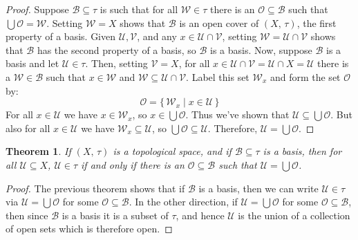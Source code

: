 \documentclass{article}
\theoremstyle{plain}
\newtheorem{theorem}{Theorem}[section]
\theoremstyle{normal}
\begin{document}
        \begin{proof}
            Suppose $\mathcal{B}\subseteq\tau$ is such that for all
            $\mathcal{W}\in\tau$ there is an $\mathcal{O}\subseteq\mathcal{B}$
            such that $\bigcup\mathcal{O}=\mathcal{W}$. Setting
            $\mathcal{W}=X$ shows that $\mathcal{B}$ is an open cover of
            $(X,\,\tau)$, the first property of a basis. Given
            $\mathcal{U},\mathcal{V}$, and any $x\in\mathcal{U}\cap\mathcal{V}$,
            setting $\mathcal{W}=\mathcal{U}\cap\mathcal{V}$ shows that
            $\mathcal{B}$ has the second property of a basis, so
            $\mathcal{B}$ is a basis. Now, suppose $\mathcal{B}$ is a
            basis and let $\mathcal{U}\in\tau$. Then, setting
            $\mathcal{V}=X$, for all
            $x\in\mathcal{U}\cap\mathcal{V}=\mathcal{U}\cap{X}=\mathcal{U}$
            there is a $\mathcal{W}\in\mathcal{B}$ such that
            $x\in\mathcal{W}$ and
            $\mathcal{W}\subseteq\mathcal{U}\cap\mathcal{V}$. Label this
            set $\mathcal{W}_{x}$ and form the set $\mathcal{O}$ by:
            \begin{equation}
                \mathcal{O}=\{\,\mathcal{W}_{x}\;|\;x\in\mathcal{U}\,\}
            \end{equation}
            For all $x\in\mathcal{U}$ we have $x\in\mathcal{W}_{x}$, so
            $x\in\bigcup\mathcal{O}$. Thus we've shown that
            $\mathcal{U}\subseteq\bigcup\mathcal{O}$. But also for all
            $x\in\mathcal{U}$ we have $\mathcal{W}_{x}\subseteq\mathcal{U}$,
            so $\bigcup\mathcal{O}\subseteq\mathcal{U}$. Therefore,
            $\mathcal{U}=\bigcup\mathcal{O}$.
        \end{proof}
        \begin{theorem}
            If $(X,\,\tau)$ is a topological space, and if
            $\mathcal{B}\subseteq\tau$ is a basis, then for all
            $\mathcal{U}\subseteq{X}$, $\mathcal{U}\in\tau$ if and only if
            there is an $\mathcal{O}\subseteq\mathcal{B}$ such that
            $\mathcal{U}=\bigcup\mathcal{O}$.
        \end{theorem}
        \begin{proof}
            The previous theorem shows that if $\mathcal{B}$ is a basis, then
            we can write $\mathcal{U}\in\tau$ via
            $\mathcal{U}=\bigcup\mathcal{O}$ for some
            $\mathcal{O}\subseteq\mathcal{B}$. In the other direction, if
            $\mathcal{U}=\bigcup\mathcal{O}$ for some
            $\mathcal{O}\subseteq\mathcal{B}$, then since $\mathcal{B}$ is a
            basis it is a subset of $\tau$, and hence $\mathcal{U}$ is the
            union of a collection of open sets which is therefore open.
        \end{proof}
\end{document}
